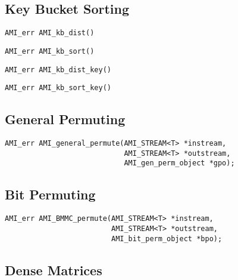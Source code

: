 \subsection{Key Bucket Sorting}


\tobeextended

\begin{verbatim}
AMI_err AMI_kb_dist()
\end{verbatim}

\begin{verbatim}
AMI_err AMI_kb_sort()
\end{verbatim}

\begin{verbatim}
AMI_err AMI_kb_dist_key()
\end{verbatim}

\begin{verbatim}
AMI_err AMI_kb_sort_key()
\end{verbatim}


\subsection{General Permuting}


\tobeextended

\begin{verbatim}
AMI_err AMI_general_permute(AMI_STREAM<T> *instream, 
                            AMI_STREAM<T> *outstream, 
                            AMI_gen_perm_object *gpo);
\end{verbatim}

\subsection{Bit Permuting}


\tobeextended

\begin{verbatim}
AMI_err AMI_BMMC_permute(AMI_STREAM<T> *instream, 
                         AMI_STREAM<T> *outstream, 
                         AMI_bit_perm_object *bpo);
\end{verbatim}

\subsection{Dense Matrices}

